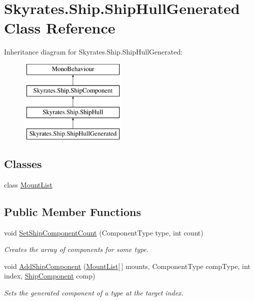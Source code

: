 \hypertarget{class_skyrates_1_1_ship_1_1_ship_hull_generated}{\section{Skyrates.\-Ship.\-Ship\-Hull\-Generated Class Reference}
\label{class_skyrates_1_1_ship_1_1_ship_hull_generated}
}
Inheritance diagram for Skyrates.\-Ship.\-Ship\-Hull\-Generated\-:\begin{figure}[H]
\begin{center}
\leavevmode
\includegraphics[height=4.000000cm]{class_skyrates_1_1_ship_1_1_ship_hull_generated}
\end{center}
\end{figure}
\subsection*{Classes}
\begin{DoxyCompactItemize}
\item 
class \hyperlink{class_skyrates_1_1_ship_1_1_ship_hull_generated_1_1_mount_list}{Mount\-List}
\end{DoxyCompactItemize}
\subsection*{Public Member Functions}
\begin{DoxyCompactItemize}
\item 
void \hyperlink{class_skyrates_1_1_ship_1_1_ship_hull_generated_a1ce803931ed23b2a862ff81f9bb3f22f}{Set\-Ship\-Component\-Count} (Component\-Type type, int count)
\begin{DoxyCompactList}\small\item\em Creates the array of components for some type. \end{DoxyCompactList}\item 
void \hyperlink{class_skyrates_1_1_ship_1_1_ship_hull_generated_a1894b2da67721a90c1b7ecb3a9386068}{Add\-Ship\-Component} (\hyperlink{class_skyrates_1_1_ship_1_1_ship_hull_generated_1_1_mount_list}{Mount\-List}\mbox{[}$\,$\mbox{]} mounts, Component\-Type comp\-Type, int index, \hyperlink{class_skyrates_1_1_ship_1_1_ship_component}{Ship\-Component} comp)
\begin{DoxyCompactList}\small\item\em Sets the generated component of a type at the target index. \end{DoxyCompactList}\end{DoxyCompactItemize}
